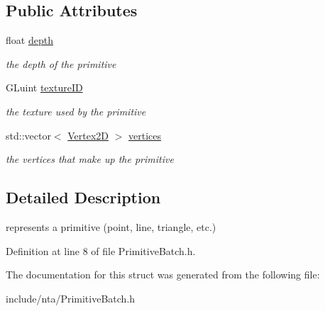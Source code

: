 \subsection*{Public Attributes}
\begin{DoxyCompactItemize}
\item 
\mbox{\label{structnta_1_1Primitive_a4443e427fb512898693bba61a8ac4654}} 
float \hyperlink{structnta_1_1Primitive_a4443e427fb512898693bba61a8ac4654}{depth}
\begin{DoxyCompactList}\small\item\em the depth of the primitive \end{DoxyCompactList}\item 
\mbox{\label{structnta_1_1Primitive_a203f519bb8fefeaae5253ef3739b7701}} 
G\+Luint \hyperlink{structnta_1_1Primitive_a203f519bb8fefeaae5253ef3739b7701}{texture\+ID}
\begin{DoxyCompactList}\small\item\em the texture used by the primitive \end{DoxyCompactList}\item 
\mbox{\label{structnta_1_1Primitive_a4fbc49e3dcd593551b6e65e59d842687}} 
std\+::vector$<$ \hyperlink{structnta_1_1Vertex2D}{Vertex2D} $>$ \hyperlink{structnta_1_1Primitive_a4fbc49e3dcd593551b6e65e59d842687}{vertices}
\begin{DoxyCompactList}\small\item\em the vertices that make up the primitive \end{DoxyCompactList}\end{DoxyCompactItemize}


\subsection{Detailed Description}
represents a primitive (point, line, triangle, etc.) 

Definition at line 8 of file Primitive\+Batch.\+h.



The documentation for this struct was generated from the following file\+:\begin{DoxyCompactItemize}
\item 
include/nta/Primitive\+Batch.\+h\end{DoxyCompactItemize}

